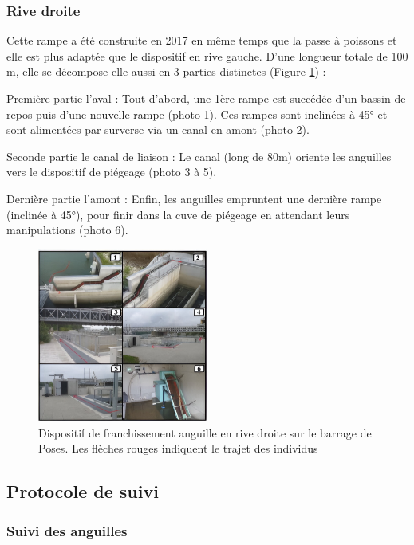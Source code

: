 \documentclass[11pt,titlepage,twoside]{article}\usepackage[]{graphicx}\usepackage[table]{xcolor}
\begin{document}
\subsubsection{Rive droite }

Cette rampe a été construite en 2017 en même temps que la passe à poissons et elle est plus adaptée que le dispositif en rive gauche. D’une longueur totale de 100 m, elle se décompose elle aussi en 3 parties distinctes (Figure \ref{RD2}) :

Première partie l’aval : Tout d’abord, une 1ère rampe est succédée d’un bassin de repos puis d’une nouvelle rampe (photo 1). Ces rampes sont inclinées à 45° et sont alimentées par surverse via un canal en amont (photo 2).

Seconde partie le canal de liaison : Le canal (long de 80m) oriente les anguilles vers le dispositif de piégeage (photo 3 à 5). 

Dernière partie l’amont :  Enfin, les anguilles empruntent une dernière rampe (inclinée à 45°), pour finir dans la cuve de piégeage en attendant leurs manipulations (photo 6).

\begin{figure}[htpb]
\centering
\includegraphics[width=0.5\textwidth]{RD2}
\caption{Dispositif de franchissement anguille en rive droite sur le barrage de Poses. Les flèches rouges indiquent le trajet des individus}
\label{RD2}
\end{figure}

\subsection{Protocole de suivi }

\subsubsection{Suivi des anguilles }
\end{document}
